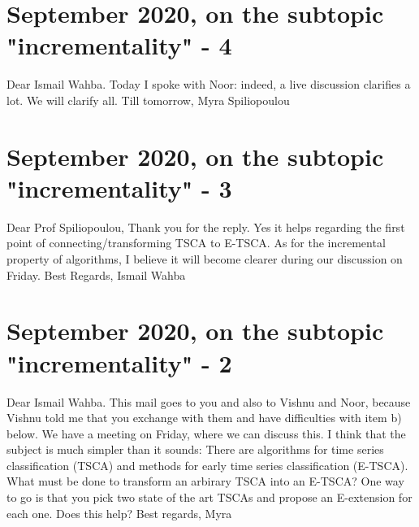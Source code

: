 \documentclass{article}
\begin{document}
\section*{\texorpdfstring{}. September 2020, on the subtopic "incrementality" - 4}
Dear Ismail Wahba.\newline
Today I spoke with Noor: indeed, a live discussion clarifies a lot. We will clarify all.\newline
Till tomorrow,\newline
Myra Spiliopoulou

\section*{\texorpdfstring{}. September 2020, on the subtopic "incrementality" - 3}
Dear Prof Spiliopoulou,\newline
Thank you for the reply.\newline
Yes it helps regarding the first point of connecting/transforming TSCA to E-TSCA.\newline
As for the incremental property of algorithms, I believe it will become clearer during our discussion on Friday.\newline
Best Regards,\newline
Ismail Wahba

\section*{\texorpdfstring{}. September 2020, on the subtopic "incrementality" - 2}
Dear Ismail Wahba.\newline
This mail goes to you and also to Vishnu and Noor, because Vishnu told me that you exchange with them and have difficulties with item b) below.\newline
We have a meeting on Friday, where we can discuss this. I think that the subject is much simpler than it sounds:\newline
There are algorithms for time series classification (TSCA) and methods for early time series classification (E-TSCA).\newline
What must be done to transform an arbirary TSCA into an E-TSCA?\newline
One way to go is that you pick two state of the art TSCAs and propose an E-extension for each one.\newline
Does this help?\newline
Best regards,\newline
Myra
\end{document}
